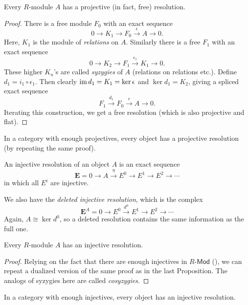 \begin{prop}
    Every $R$-module $A$ has a projective (in fact, free) resolution. 
\end{prop}
\begin{proof}
     There is a free module $F_0$ with an exact sequence
     \[0\to K_1\to F_0\overset\epsilon\to A\to 0.\]
     Here, $K_1$ is the module of \emph{relations} on $A$. Similarly there is a free $F_1$ with an exact sequence
     \[0\to K_2\to F_1\overset{\epsilon_1}\to K_1\to 0.\]
     These higher $K_n$'s are called \emph{syzygies} of $A$ (relations on relations etc.).
     Define $d_1=i_1\circ\epsilon_1$. Then clearly $\operatorname{im} d_1=K_1=\ker\epsilon$ and $\ker d_1=K_2$, giving a spliced exact sequence
     \[F_1\overset{d_1}\to F_0\overset\epsilon\to A\to 0.\]
     Iterating this construction, we get a free resolution (which is also projective and flat).
\end{proof}
\begin{cor}
    In a category with enough projectives, every object has a projective resolution (by repeating the same proof).
\end{cor}

\begin{defn}
    An injective resolution of an object $A$ is an exact sequence
    \[\bm{E}=0\to A\overset\eta\to E^0\to E^1\to E^2\to \cdots\]
    in which all $E^i$ are injective.
    
    We also have the \emph{deleted injective resolution}, which is the complex
    \[\bm{E}^A=0\to E^0\overset{d^0}\to E^1\to E^2\to \cdots\]
    Again, $A\cong\ker d^0$, so a deleted resolution contains the same information as the full one.
\end{defn}

\begin{prop}
    Every $R$-module $A$ has an injective resolution.
\end{prop}
\begin{proof}
     Relying on the fact that there are enough injectives in $R\text{-}\mathsf{Mod}$ (\cite[Thm. 3.38]{Rotman}), we can repeat a dualized version of the same proof as in the last Proposition. The analogs of syzygies here are called \emph{cosyzygies}.
\end{proof}
\begin{cor}
    In a category with enough injectives, every object has an injective resolution.
\end{cor}

